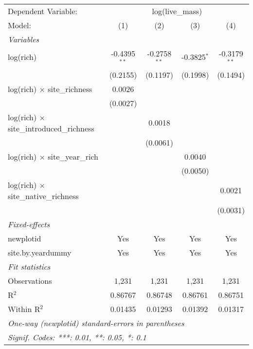 \begin{tabular}{lcccc}
\tabularnewline\midrule\midrule
Dependent Variable:&\multicolumn{4}{c}{log(live\_mass)}\\
Model:&(1) & (2) & (3) & (4)\\
\midrule \emph{Variables}&   &   &   &  \\
log(rich)&-0.4395$^{**}$ & -0.2758$^{**}$ & -0.3825$^{*}$ & -0.3179$^{**}$\\
  &(0.2155) & (0.1197) & (0.1998) & (0.1494)\\
log(rich) $\times $ site\_richness&0.0026 &    &    &   \\
  &(0.0027) &    &    &   \\
log(rich) $\times $ site\_introduced\_richness&   & 0.0018 &    &   \\
  &   & (0.0061) &    &   \\
log(rich) $\times $ site\_year\_rich&   &    & 0.0040 &   \\
  &   &    & (0.0050) &   \\
log(rich) $\times $ site\_native\_richness&   &    &    & 0.0021\\
  &   &    &    & (0.0031)\\
\midrule \emph{Fixed-effects}&   &   &   &  \\
newplotid & Yes & Yes & Yes & Yes\\
site.by.yeardummy & Yes & Yes & Yes & Yes\\
\midrule \emph{Fit statistics}&  & & & \\
Observations & 1,231&1,231&1,231&1,231\\
R$^2$ & 0.86767&0.86748&0.86761&0.86751\\
Within R$^2$ & 0.01435&0.01293&0.01392&0.01317\\
\midrule\midrule\multicolumn{5}{l}{\emph{One-way (newplotid) standard-errors in parentheses}}\\
\multicolumn{5}{l}{\emph{Signif. Codes: ***: 0.01, **: 0.05, *: 0.1}}\\
\end{tabular}



